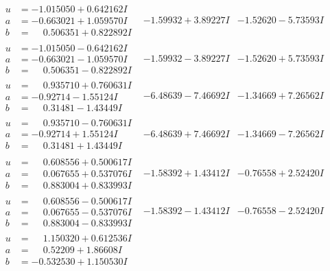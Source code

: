 \documentclass[1p]{elsarticle_modified}
\theoremstyle{definition}
\begin{document}
$$\begin{array}{c|c|c}
\begin{aligned}
u &= -1.015050 + 0.642162 I \\
a &= -0.663021 + 1.059570 I \\
b &= \phantom{-}0.506351 + 0.822892 I\end{aligned}
 & -1.59932 + 3.89227 I & -1.52620 - 5.73593 I \\ \hline\begin{aligned}
u &= -1.015050 - 0.642162 I \\
a &= -0.663021 - 1.059570 I \\
b &= \phantom{-}0.506351 - 0.822892 I\end{aligned}
 & -1.59932 - 3.89227 I & -1.52620 + 5.73593 I \\ \hline\begin{aligned}
u &= \phantom{-}0.935710 + 0.760631 I \\
a &= -0.92714 - 1.55124 I \\
b &= \phantom{-}0.31481 - 1.43449 I\end{aligned}
 & -6.48639 - 7.46692 I & -1.34669 + 7.26562 I \\ \hline\begin{aligned}
u &= \phantom{-}0.935710 - 0.760631 I \\
a &= -0.92714 + 1.55124 I \\
b &= \phantom{-}0.31481 + 1.43449 I\end{aligned}
 & -6.48639 + 7.46692 I & -1.34669 - 7.26562 I \\ \hline\begin{aligned}
u &= \phantom{-}0.608556 + 0.500617 I \\
a &= \phantom{-}0.067655 + 0.537076 I \\
b &= \phantom{-}0.883004 + 0.833993 I\end{aligned}
 & -1.58392 + 1.43412 I & -0.76558 + 2.52420 I \\ \hline\begin{aligned}
u &= \phantom{-}0.608556 - 0.500617 I \\
a &= \phantom{-}0.067655 - 0.537076 I \\
b &= \phantom{-}0.883004 - 0.833993 I\end{aligned}
 & -1.58392 - 1.43412 I & -0.76558 - 2.52420 I \\ \hline\begin{aligned}
u &= \phantom{-}1.150320 + 0.612536 I \\
a &= \phantom{-}0.52209 + 1.86608 I \\
b &= -0.532530 + 1.150530 I\end{aligned}

\end{array}$$
\end{document}
